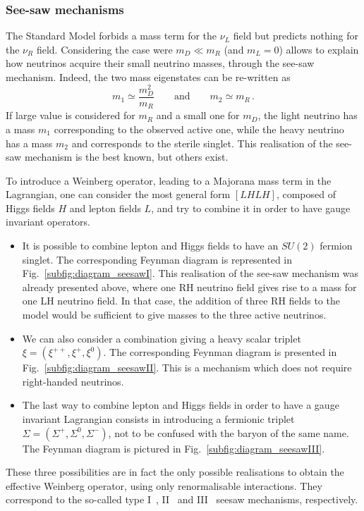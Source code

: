 \subsubsection*{See-saw mechanisms}

The Standard Model forbids a mass term for the $\nu_L$ field but predicts nothing for the $\nu_R$ field.
Considering the case were $m_D \ll m_R$ (and $m_L=0$) allows to explain how neutrinos acquire their small neutrino masses, through the see-saw mechanism.
Indeed, the two mass eigenstates can be re-written as
\begin{equation}
  m_1\simeq \frac{m_D^2}{m_R} \qquad \text{and} \qquad m_2\simeq m_R\,.
\end{equation}
If large value is considered for $m_R$ and a small one for $m_D$, the light neutrino has a mass $m_1$ corresponding to the observed active one, while the heavy neutrino has a mass $m_2$ and corresponds to the sterile singlet.
This realisation of the see-saw mechanism is the best known, but others exist.

To introduce a Weinberg operator, leading to a Majorana mass term in the Lagrangian, one can consider the most general form $[L H L H]$, composed of Higgs fields $H$ and lepton fields $L$, and try to combine it in order to have gauge invariant operators.
\begin{itemize}
\item It is possible to combine lepton and Higgs fields to have an $SU(2)$ fermion singlet.
  The corresponding Feynman diagram is represented in Fig.~\ref{subfig:diagram_seesawI}.
  This realisation of the see-saw mechanism was already presented above, where one RH neutrino field gives rise to a mass for one LH neutrino field.
  In that case, the addition of three RH fields to the model would be sufficient to give masses to the three active neutrinos.
\item We can also consider a combination giving a heavy scalar triplet ${\xi = (\xi^{++},\xi^{+},\xi^{0})}$.
  The corresponding Feynman diagram is presented in Fig.~\ref{subfig:diagram_seesawII}.
  This is a mechanism which does not require right-handed neutrinos.
\item The last way to combine lepton and Higgs fields in order to have a gauge invariant Lagrangian consists in introducing a fermionic triplet ${\Sigma = (\Sigma^{+},\Sigma^{0},\Sigma^{-})}$, not to be confused with the baryon of the same name.
  The Feynman diagram is pictured in Fig.~\ref{subfig:diagram_seesawIII}.
\end{itemize}
These three possibilities are in fact the only possible realisations to obtain the effective Weinberg operator, using only renormalisable interactions.
They correspond to the so-called type I~\cite{Minkowski_1977}, II~\cite{Ernest_1998} and III~\cite{Marshak_1980} seesaw mechanisms, respectively.

